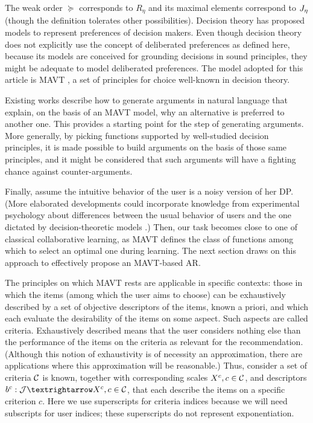 \documentclass[version=3.21, pagesize, twoside=off, bibliography=totoc, DIV=calc, fontsize=12pt, a4paper, french, english]{scrartcl}
\begin{document}
The weak order ${\succeq}$ corresponds to $R_\eta$ and its maximal elements correspond to $J_{\eta}$ (though the definition tolerates other possibilities). Decision theory has proposed models to represent preferences of decision makers. Even though decision theory does not explicitly use the concept of deliberated preferences as defined here, because its models are conceived for grounding decisions in sound principles, they might be adequate to model deliberated preferences. 
The model adopted for this article is \ac{MAVT} \citep{keeney_decisions_1993}, a set of principles for choice well-known in decision theory.

Existing works \citep{carenini_generating_2006, labreuche_general_2011} describe how to generate arguments in natural language that explain, on the basis of an \ac{MAVT} model, why an alternative is preferred to another one. This provides a starting point for the step of generating arguments.
More generally, by picking functions supported by well-studied decision principles, it is made possible to build arguments on the basis of those same principles, and it might be considered that such arguments will have a fighting chance against counter-arguments.

Finally, assume the intuitive behavior of the user is a noisy version of her \ac{DP}. (More elaborated developments could incorporate knowledge from experimental psychology about differences between the usual behavior of users and the one dictated by decision-theoretic models \citep{kahneman_thinking_2013}.)
Then, our task becomes close to one of classical collaborative learning, as \ac{MAVT} defines the class of functions among which to select an optimal one during learning. The next section draws on this approach to effectively propose an \ac{MAVT}-based \ac{AR}.

The principles on which \ac{MAVT} rests are applicable in specific contexts: those in which the items (among which the user aims to choose) can be exhaustively described by a set of objective descriptors of the items, known a priori, and which each evaluate the desirability of the items on some aspect. Such aspects are called criteria. Exhaustively described means that the user considers nothing else than the performance of the items on the criteria as relevant for the recommendation. (Although this notion of exhaustivity is of necessity an approximation, there are applications where this approximation will be reasonable.)
Thus, consider a set of criteria $\mathcal{C}$ is known, together with corresponding scales $X^c, c \in \mathcal{C}$, and descriptors $b^c: \allitems → X^c, c \in \allcrits$, that each describe the items on a specific criterion $c$. Here we use superscripts for criteria indices because we will need subscripts for user indices; these superscripts do not represent exponentiation.
\end{document}
